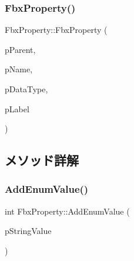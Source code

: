 \mbox{\label{class_fbx_property_a019739c19f5652349afb9780945e57f0}} 
\subsubsection{\texorpdfstring{Fbx\+Property()}{FbxProperty()}\hspace{0.1cm}{\footnotesize\ttfamily [5/5]}}
{\footnotesize\ttfamily Fbx\+Property\+::\+Fbx\+Property (\begin{DoxyParamCaption}\item[{const \hyperlink{class_fbx_property}{Fbx\+Property} \&}]{p\+Parent,  }\item[{const char $\ast$}]{p\+Name,  }\item[{const \hyperlink{class_fbx_data_type}{Fbx\+Data\+Type} \&}]{p\+Data\+Type,  }\item[{const char $\ast$}]{p\+Label }\end{DoxyParamCaption})\hspace{0.3cm}{\ttfamily [protected]}}



\subsection{メソッド詳解}
\mbox{\label{class_fbx_property_aa25239a939eb238e2eb239040364e286}} 
\subsubsection{\texorpdfstring{Add\+Enum\+Value()}{AddEnumValue()}}
{\footnotesize\ttfamily int Fbx\+Property\+::\+Add\+Enum\+Value (\begin{DoxyParamCaption}\item[{const char $\ast$}]{p\+String\+Value }\end{DoxyParamCaption})}

